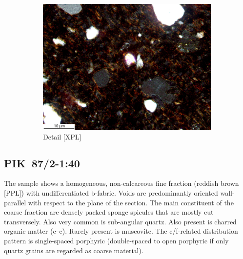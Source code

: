 \documentclass[a4paper]{article}
\begin{document}
\begin{figure}[H]
\begin{subfigure}[t]{.32\textwidth}
		\includegraphics[width=\textwidth]{ThinSections/53-3_20x_XPL.jpg}
		\caption{Detail [XPL]}
	\end{subfigure}
	\caption{}
	\label{fig:53_pik}
\end{figure}

\newpage\subsection{PIK~87/2-1:40 \citep[pik\#99; Fig.~\ref{fig:pik.pottery}.12; Ebambe style;][430 Pl.~49.10]{Seidensticker.2021e}}

\begin{multicols}{2}
\noindent The sample shows a homogeneous, non-calcareous fine fraction (reddish brown [PPL]) with undifferentiated b-fabric. Voids are predominantly oriented wall-parallel with respect to the plane of the section. The main constituent of the coarse fraction are densely packed sponge spicules that are mostly cut transversely. Also very common is sub-angular quartz. Also present is charred organic matter (c--e). Rarely present is muscovite. The c/f-related distribution pattern is single-spaced porphyric (double-spaced to open porphyric if only quartz grains are regarded as coarse material).
\end{multicols}
\end{document}
